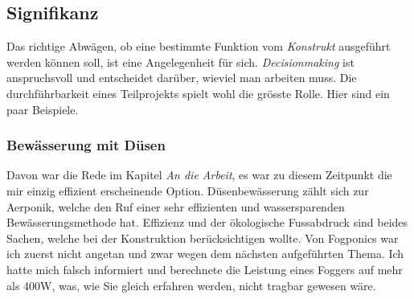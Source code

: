 \documentclass[12pt,titlepage,a4paper]{article}
\begin{document}
\subsection{Signifikanz}
Das richtige Abwägen, ob eine bestimmte Funktion vom \textit{Konstrukt} ausgeführt werden können soll, ist eine Angelegenheit für sich. \textit{Decisionmaking} ist anspruchsvoll und entscheidet darüber, wieviel man arbeiten muss. Die durchführbarkeit eines Teilprojekts spielt wohl die grösste Rolle. Hier sind ein paar Beispiele.
\subsubsection{Bewässerung mit Düsen}
Davon war die Rede im Kapitel \textit{An die Arbeit}, es war zu diesem Zeitpunkt die mir einzig effizient erscheinende Option. Düsenbewässerung zählt sich zur Aerponik, welche den Ruf einer sehr effizienten und wassersparenden Bewässerungsmethode hat. Effizienz und der ökologische Fussabdruck sind beides Sachen, welche bei der Konstruktion berücksichtigen wollte. Von Fogponics war ich zuerst nicht angetan und zwar wegen dem nächsten aufgeführten Thema. Ich hatte mich falsch informiert und berechnete die Leistung eines Foggers auf mehr als 400W, was, wie Sie gleich erfahren werden, nicht tragbar gewesen wäre.
\end{document}
